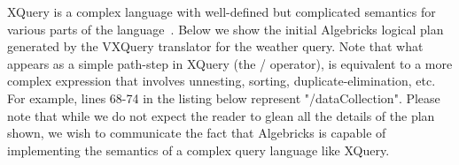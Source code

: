 XQuery is a complex language with well-defined but complicated semantics for various parts of the language~\cite{XQuery-W3C-Formal-Semantics}.
Below we show the initial Algebricks logical plan generated by the VXQuery translator for the weather query.
Note that what appears as a simple path-step in XQuery (the / operator), is equivalent to a more complex expression that involves unnesting, sorting, duplicate-elimination, etc.
For example, lines 68-74 in the listing below represent "/dataCollection".
Please note that while we do not expect the reader to glean all the details of the plan shown, we wish to communicate the fact that Algebricks is capable of implementing the semantics of a complex query language like XQuery.

\newpage


